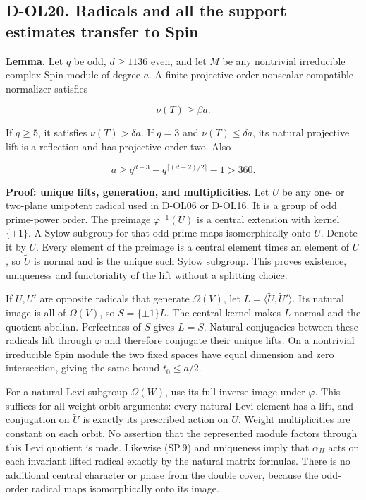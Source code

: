\subsection{D-OL20. Radicals and all the support estimates transfer to Spin}\label{SF-SPIN:d-ol20.-radicals-and-all-the-support-estimates-transfer-to-spin}

\textbf{Lemma.} Let \(q\) be odd, \(d\ge1136\) even, and let \(M\) be any nontrivial irreducible complex Spin module of degree \(a\). A finite-projective-order nonscalar compatible normalizer satisfies

\[
 \nu(T)\ge\beta a.
 \tag{SP.12}
\]

If \(q\ge5\), it satisfies \(\nu(T)>\delta a\). If \(q=3\) and \(\nu(T)\le\delta a\), its natural projective lift is a reflection and has projective order two. Also

\[
 a\ge q^{d-3}-q^{\lceil(d-2)/2\rceil}-1>360.
 \tag{SP.13}
\]

\textbf{Proof: unique lifts, generation, and multiplicities.} Let \(U\) be any one- or two-plane unipotent radical used in D-OL06 or D-OL16. It is a group of odd prime-power order. The preimage \(\varphi^{-1}(U)\) is a central extension with kernel \(\{\pm1\}\). A Sylow subgroup for that odd prime maps isomorphically onto \(U\). Denote it by \(\widetilde U\). Every element of the preimage is a central element times an element of \(\widetilde U\), so \(\widetilde U\) is normal and is the unique such Sylow subgroup. This proves existence, uniqueness and functoriality of the lift without a splitting choice.

If \(U,U'\) are opposite radicals that generate \(\Omega(V)\), let \(L=\langle\widetilde U,\widetilde U'\rangle\). Its natural image is all of \(\Omega(V)\), so \(S=\{\pm1\}L\). The central kernel makes \(L\) normal and the quotient abelian. Perfectness of \(S\) gives \(L=S\). Natural conjugacies between these radicals lift through \(\varphi\) and therefore conjugate their unique lifts. On a nontrivial irreducible Spin module the two fixed spaces have equal dimension and zero intersection, giving the same bound \(t_0\le a/2\).

For a natural Levi subgroup \(\Omega(W)\), use its full inverse image under \(\varphi\). This suffices for all weight-orbit arguments: every natural Levi element has a lift, and conjugation on \(\widetilde U\) is exactly its prescribed action on \(U\). Weight multiplicities are constant on each orbit. No assertion that the represented module factors through this Levi quotient is made. Likewise (SP.9) and uniqueness imply that \(\alpha_H\) acts on each invariant lifted radical exactly by the natural matrix formulas. There is no additional central character or phase from the double cover, because the odd-order radical maps isomorphically onto its image.

